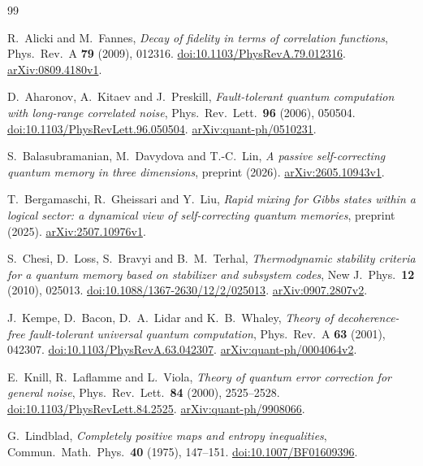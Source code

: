 \documentclass[11pt,reqno]{amsart}
\numberwithin{equation}{section}
\theoremstyle{definition}
\theoremstyle{remark}
\begin{document}
\begin{thebibliography}{99}
\raggedright

R.~Alicki and M.~Fannes,
\emph{Decay of fidelity in terms of correlation functions},
Phys.\ Rev.\ A \textbf{79} (2009), 012316.
\href{https://doi.org/10.1103/PhysRevA.79.012316}{doi:10.1103/PhysRevA.79.012316}.
\href{https://arxiv.org/abs/0809.4180v1}{arXiv:0809.4180v1}.

D.~Aharonov, A.~Kitaev and J.~Preskill,
\emph{Fault-tolerant quantum computation with long-range correlated noise},
Phys.\ Rev.\ Lett.\ \textbf{96} (2006), 050504.
\href{https://doi.org/10.1103/PhysRevLett.96.050504}{doi:10.1103/PhysRevLett.96.050504}.
\href{https://arxiv.org/abs/quant-ph/0510231}{arXiv:quant-ph/0510231}.

S.~Balasubramanian, M.~Davydova and T.-C.~Lin,
\emph{A passive self-correcting quantum memory in three dimensions},
preprint (2026).
\href{https://arxiv.org/abs/2605.10943v1}{arXiv:2605.10943v1}.

T.~Bergamaschi, R.~Gheissari and Y.~Liu,
\emph{Rapid mixing for Gibbs states within a logical sector:
a dynamical view of self-correcting quantum memories},
preprint (2025).
\href{https://arxiv.org/abs/2507.10976v1}{arXiv:2507.10976v1}.

S.~Chesi, D.~Loss, S.~Bravyi and B.~M.~Terhal,
\emph{Thermodynamic stability criteria for a quantum memory based on
stabilizer and subsystem codes},
New J.\ Phys.\ \textbf{12} (2010), 025013.
\href{https://doi.org/10.1088/1367-2630/12/2/025013}{doi:10.1088/1367-2630/12/2/025013}.
\href{https://arxiv.org/abs/0907.2807v2}{arXiv:0907.2807v2}.

J.~Kempe, D.~Bacon, D.~A.~Lidar and K.~B.~Whaley,
\emph{Theory of decoherence-free fault-tolerant universal quantum computation},
Phys.\ Rev.\ A \textbf{63} (2001), 042307.
\href{https://doi.org/10.1103/PhysRevA.63.042307}{doi:10.1103/PhysRevA.63.042307}.
\href{https://arxiv.org/abs/quant-ph/0004064v2}{arXiv:quant-ph/0004064v2}.

E.~Knill, R.~Laflamme and L.~Viola,
\emph{Theory of quantum error correction for general noise},
Phys.\ Rev.\ Lett.\ \textbf{84} (2000), 2525--2528.
\href{https://doi.org/10.1103/PhysRevLett.84.2525}{doi:10.1103/PhysRevLett.84.2525}.
\href{https://arxiv.org/abs/quant-ph/9908066}{arXiv:quant-ph/9908066}.

G.~Lindblad,
\emph{Completely positive maps and entropy inequalities},
Commun.\ Math.\ Phys.\ \textbf{40} (1975), 147--151.
\href{https://doi.org/10.1007/BF01609396}{doi:10.1007/BF01609396}.


\end{thebibliography}
\end{document}
